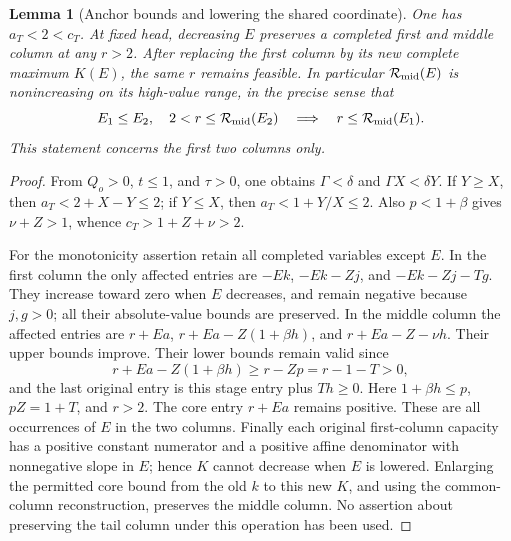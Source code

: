 \documentclass[11pt,reqno]{amsart}
\newtheorem{lemma}[theorem]{Lemma}
\theoremstyle{definition}
\theoremstyle{remark}
\begin{document}
\begin{lemma}[Anchor bounds and lowering the shared coordinate]
\label{s3:wall-monotonicity}
One has \(a_T<2<c_T\). At fixed head, decreasing \(E\) preserves
a completed first and middle column at any \(r>2\).
After replacing the first column by its new complete maximum
\(K(E)\), the same \(r\) remains feasible. In particular
\(\mathcal R_{\rm mid}(E)\) is nonincreasing on its high-value
range, in the precise sense that
\[
 E_1\le E_2,\quad 2<r\le\mathcal R_{\rm mid}(E_2)
 \quad\Longrightarrow\quad
 r\le\mathcal R_{\rm mid}(E_1).
\]
This statement concerns the first two columns only.
\end{lemma}
\begin{proof}
From \(Q_o>0\), \(t\le1\), and \(\tau>0\), one obtains
\(\Gamma<\delta\) and \(\Gamma X<\delta Y\).
If \(Y\ge X\), then \(a_T<2+X-Y\le2\);
if \(Y\le X\), then \(a_T<1+Y/X\le2\).
Also \(p<1+\beta\) gives \(\nu+Z>1\), whence
\(c_T>1+Z+\nu>2\).

For the monotonicity assertion retain all completed variables except
\(E\). In the first column the only affected entries are
\(-Ek\), \(-Ek-Zj\), and \(-Ek-Zj-Tg\).
They increase toward zero when \(E\) decreases, and remain negative
because \(j,g>0\); all their absolute-value bounds are preserved.
In the middle column the affected entries are
\(r+Ea\), \(r+Ea-Z(1+\beta h)\), and
\(r+Ea-Z-\nu h\). Their upper bounds improve. Their lower bounds
remain valid since
\[
 r+Ea-Z(1+\beta h)\ge r-Zp=r-1-T>0,
\]
and the last original entry is this stage entry plus \(Th\ge0\).
Here \(1+\beta h\le p\), \(pZ=1+T\), and \(r>2\).
The core entry \(r+Ea\) remains positive. These are all occurrences
of \(E\) in the two columns. Finally each original first-column
capacity has a positive constant numerator and a positive affine
denominator with nonnegative slope in \(E\); hence \(K\) cannot
decrease when \(E\) is lowered. Enlarging the permitted core bound
from the old \(k\) to this new \(K\), and using the common-column
reconstruction, preserves the middle column. No assertion about
preserving the tail column under this operation has been used.
\end{proof}
\end{document}
